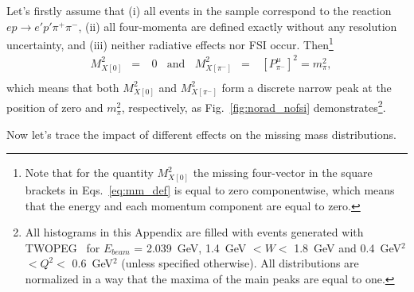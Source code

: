 \vspace{-1.5em}
Let's firstly assume that (i) all events in the sample correspond to the reaction $ep\rightarrow e'p'\pi^{+}\pi^{-}$, (ii) all four-momenta are defined exactly without any resolution uncertainty, and (iii) neither radiative effects nor FSI occur. Then\footnote[1]{Note that for the quantity $M_{X[0]}^{2}$ the missing four-vector in the square brackets in Eqs.~\eqref{eq:mm_def} is equal to zero componentwise, which means that the energy and each momentum component are equal to zero.} \vspace{-0.5em}
\begin{equation}
\begin{aligned}
&M_{X[0]}^{2}&=&~0~~~~\textrm{and}~~~~M_{X[\pi^{-}]}^{2}&=&~[P_{\pi^{-}}^{\mu}]^{2}=m_{\pi}^{2},\\[-7pt]
\end{aligned}\label{eq:rrr}
\end{equation}
which means that both $M_{X[0]}^{2}$ and $M_{X[\pi^{-}]}^{2}$ form a discrete narrow peak at the position of zero and $m_{\pi}^{2}$, respectively, as Fig.~\ref{fig:norad_nofsi} demonstrates\footnote[2]{All histograms in this Appendix are filled with events generated with TWOPEG~\cite{twopeg} for $E_{beam}$ = 2.039~GeV, 1.4~GeV $< W <$ 1.8~GeV and 0.4~GeV$^{2}$ $< Q^{2} <$ 0.6~GeV$^{2}$ (unless specified otherwise). All distributions are normalized in a way that the maxima of the main peaks are equal to one.}.


Now let's trace the impact of different effects on the missing mass distributions.
\vspace{-0.75em}
